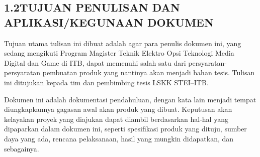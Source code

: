 \subsection*{\textsf{\normalsize 1.2\hspace{0.5cm}TUJUAN PENULISAN DAN APLIKASI\slash KEGUNAAN DOKUMEN}}

Tujuan utama tulisan ini dibuat adalah agar para penulis dokumen ini, yang sedang mengikuti Program Magister Teknik Elektro Opsi Teknologi Media Digital dan Game di ITB, dapat memenuhi salah satu dari persyaratan-persyaratan pembuatan produk yang nantinya akan menjadi bahan tesis.
Tulisan ini ditujukan kepada tim dan pembimbing tesis LSKK STEI--ITB.

Dokumen ini adalah dokumentasi pendahuluan, dengan kata lain menjadi tempat diungkapkannya gagasan awal akan produk yang dibuat.
Keputusan akan kelayakan proyek yang diajukan dapat diambil berdasarkan hal-hal yang dipaparkan dalam dokumen ini, seperti spesifikasi produk yang dituju, sumber daya yang ada, rencana pelaksanaan, hasil yang mungkin didapatkan, dan sebagainya.
